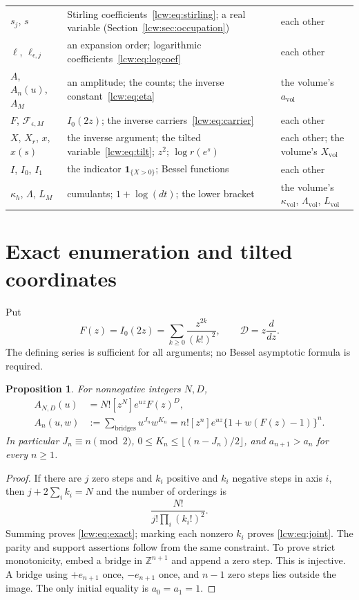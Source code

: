 \documentclass[11pt,letterpaper]{article}
\newtheorem{proposition}[theorem]{Proposition}
\theoremstyle{remark}\newtheorem{remark}[theorem]{Remark}
\newcommand{\one}{\mathbf 1}\newcommand{\DD}{\mathcal D}
\begin{document}
\begin{minipage}{\textwidth}
\begin{tabular}{@{}>{\raggedright\arraybackslash}p{0.95in}>{\raggedright\arraybackslash}p{3.45in}>{\raggedright\arraybackslash}p{1.75in}@{}}
$s_j$, $s$ & Stirling coefficients~\eqref{lcw:eq:stirling}; a real variable (Section~\ref{lcw:sec:occupation}) & each other\\
$\ell$, $\ell_{\epsilon,j}$ & an expansion order; logarithmic coefficients~\eqref{lcw:eq:logcoef} & each other\\
$A$, $A_n(u)$, $A_M$ & an amplitude; the counts; the inverse constant~\eqref{lcw:eq:eta} & the volume's $a_{\mathrm{vol}}$\\
$F$, $\mathcal F_{\epsilon,M}$ & $I_0(2z)$; the inverse carriers~\eqref{lcw:eq:carrier} & each other\\
$X$, $X_r$, $x$, $x(s)$ & the inverse argument; the tilted variable~\eqref{lcw:eq:tilt}; $z^2$; $\log r(e^s)$ & each other; the volume's $X_{\mathrm{vol}}$\\
$I$, $I_0$, $I_1$ & the indicator $\one_{\{X>0\}}$; Bessel functions & each other\\
$\kappa_h$, $\Lambda$, $L_M$ & cumulants; $1+\log(dt)$; the lower bracket & the volume's $\kappa_{\mathrm{vol}}$, $\Lambda_{\mathrm{vol}}$, $L_{\mathrm{vol}}$\\
\bottomrule
\end{tabular}
\endgroup
\end{minipage}

\section{Exact enumeration and tilted coordinates}\label{lcw:sec:exact}
Put
\begin{equation}\label{lcw:eq:F}
 F(z)=I_0(2z)=\sum_{k\ge0}\frac{z^{2k}}{(k!)^2},\qquad
 \DD=z\frac{d}{dz}.
\end{equation}
The defining series is sufficient for all arguments; no Bessel asymptotic formula is required.

\begin{proposition}\label{lcw:prop:exact}
For nonnegative integers $N,D$,
\begin{align}
 A_{N,D}(u)&=N![z^N]e^{uz}F(z)^D,\label{lcw:eq:exact}\\
 A_n(u,w)&:=\sum_{\text{bridges}}u^{J_n}w^{K_n}
 =n![z^n]e^{uz}\{1+w(F(z)-1)\}^n.\label{lcw:eq:joint}
\end{align}
In particular $J_n\equiv n\pmod2$, $0\le K_n\le\lfloor(n-J_n)/2\rfloor$, and
$a_{n+1}>a_n$ for every $n\ge1$.
\end{proposition}
\begin{proof}
If there are $j$ zero steps and $k_i$ positive and $k_i$ negative steps in axis $i$, then
$j+2\sum_i k_i=N$ and the number of orderings is
\[
 \frac{N!}{j!\prod_i(k_i!)^2}.
\]
Summing proves \eqref{lcw:eq:exact}; marking each nonzero $k_i$ proves \eqref{lcw:eq:joint}. The parity and support assertions follow from the same constraint. To prove strict monotonicity, embed a bridge in $\mathbb Z^{n+1}$ and append a zero step. This is injective. A bridge using $+e_{n+1}$ once, $-e_{n+1}$ once, and $n-1$ zero steps lies outside the image. The only initial equality is $a_0=a_1=1$.
\end{proof}
\end{document}
